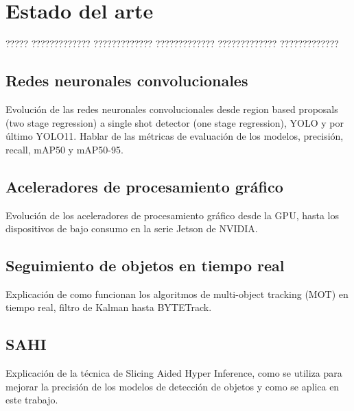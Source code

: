 \documentclass[11pt,catalan,listoffigures,listoftables]{tfgetsinf}
\begin{document}



\chapter{Estado del arte}

????? ????????????? ????????????? ????????????? ????????????? ?????????????

\section{Redes neuronales convolucionales}
Evolución de las redes neuronales convolucionales desde region based proposals (two stage regression) a single shot detector (one stage regression), YOLO y por último YOLO11. Hablar de las métricas de evaluación de los modelos, precisión, recall, mAP50 y mAP50-95.
\section{Aceleradores de procesamiento gráfico}
Evolución de los aceleradores de procesamiento gráfico desde la GPU, hasta los dispositivos de bajo consumo en la serie Jetson de NVIDIA.

\section{Seguimiento de objetos en tiempo real}
Explicación de como funcionan los algoritmos de multi-object tracking (MOT) en tiempo real, filtro de Kalman hasta BYTETrack.

\section{SAHI}
Explicación de la técnica de Slicing Aided Hyper Inference, como se utiliza para mejorar la precisión de los modelos de detección de objetos y como se aplica en este trabajo.
\end{document}
